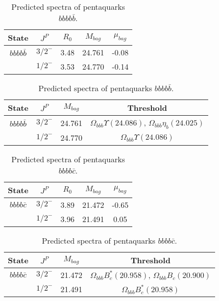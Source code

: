 \documentclass[prd,twocolumn,floatfix,nofootinbib]{revtex4}
\begin{document}
\renewcommand{\tabcolsep}{0.5cm}
\renewcommand{\arraystretch}{1.2}
\begin{table*}[!htbp]
    \caption{Predicted spectra of pentaquarks $bbbb\bar{b}$.}
    \begin{tabular}{ccccc}
        \hline\hline
        {\rm State} &$J^{P}$ &$R_{0}$ &$M_{bag}$ &$\mu_{bag}$ \\ \hline
        ${bbbb\bar{b}}$
            &${3/2}^{-}$    &3.48   &24.761 &-0.08 \\
            &${1/2}^{-}$    &3.53   &24.770 &-0.14 \\
        \hline\hline
    \end{tabular}
\end{table*}

\renewcommand{\tabcolsep}{0.5cm}
\renewcommand{\arraystretch}{1.2}
\begin{table*}[!htbp]
    \caption{Predicted spectra of pentaquarks $bbbb\bar{b}$.}
    \begin{tabular}{cccc}
        \hline\hline
        {\rm State} &$J^{P}$ &$M_{bag}$ &Threshold \\ \hline
        ${bbbb\bar{b}}$
            &${3/2}^{-}$    &24.761 &$\Omega_{bbb} \Upsilon(24.086)$, $\Omega_{bbb} \eta_{b}(24.025)$ \\
            &${1/2}^{-}$    &24.770 &$\Omega_{bbb} \Upsilon(24.086)$ \\
        \hline\hline
    \end{tabular}
\end{table*}

\renewcommand{\tabcolsep}{0.5cm}
\renewcommand{\arraystretch}{1.2}
\begin{table*}[!htbp]
    \caption{Predicted spectra of pentaquarks $bbbb\bar{c}$.}
    \begin{tabular}{ccccc}
        \hline\hline
        {\rm State} &$J^{P}$ &$R_{0}$ &$M_{bag}$ &$\mu_{bag}$ \\ \hline
        ${bbbb\bar{c}}$
            &${3/2}^{-}$    &3.89   &21.472 &-0.65 \\
            &${1/2}^{-}$    &3.96   &21.491 &0.05 \\
        \hline\hline
    \end{tabular}
\end{table*}

\renewcommand{\tabcolsep}{0.5cm}
\renewcommand{\arraystretch}{1.2}
\begin{table*}[!htbp]
    \caption{Predicted spectra of pentaquarks $bbbb\bar{c}$.}
    \begin{tabular}{cccc}
        \hline\hline
        {\rm State} &$J^{P}$ &$M_{bag}$ &Threshold \\ \hline
        ${bbbb\bar{c}}$
            &${3/2}^{-}$    &21.472 &$\Omega_{bbb} B^{\ast}_{c}(20.958)$, $\Omega_{bbb} B_{c}(20.900)$ \\
            &${1/2}^{-}$    &21.491 &$\Omega_{bbb} B^{\ast}_{c}(20.958)$ \\
        \hline\hline
    \end{tabular}
\end{table*}
\end{document}
